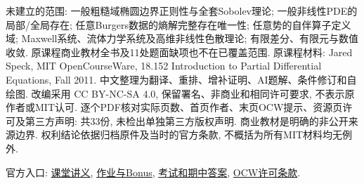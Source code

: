未建立的范围: 一般粗糙域椭圆边界正则性与全套Sobolev理论; 一般非线性PDE的局部/全局存在; 任意Burgers数据的熵解完整存在唯一性; 任意势的自伴算子定义域; Maxwell系统、流体力学系统及高维非线性色散理论; 有限差分、有限元与数值收敛. 原课程商业教材全书及11处题面缺项也不在已覆盖范围.
原课程材料: Jared Speck, MIT OpenCourseWare, 18.152 Introduction to Partial Differential Equations, Fall 2011. 中文整理为翻译、重排、增补证明、AI题解、条件修订和自绘图. 改编采用 CC BY-NC-SA 4.0, 保留署名、非商业和相同许可要求, 不表示原作者或MIT认可. 逐个PDF核对实际页数、首页作者、末页OCW提示、资源页许可及第三方声明: 共33份, 未检出单独第三方版权声明. 商业教材是明确的非公开来源边界. 权利结论依据归档原件及当时的官方条款, 不概括为所有MIT材料均无例外.

官方入口: \href{https://ocw.mit.edu/courses/18-152-introduction-to-partial-differential-equations-fall-2011/pages/lecture-notes/}{课堂讲义}, \href{https://ocw.mit.edu/courses/18-152-introduction-to-partial-differential-equations-fall-2011/pages/assignments/}{作业与Bonus}, \href{https://ocw.mit.edu/courses/18-152-introduction-to-partial-differential-equations-fall-2011/pages/exams/}{考试和期中答案}, \href{https://ocw.mit.edu/pages/privacy-and-terms-of-use/}{OCW许可条款}.
